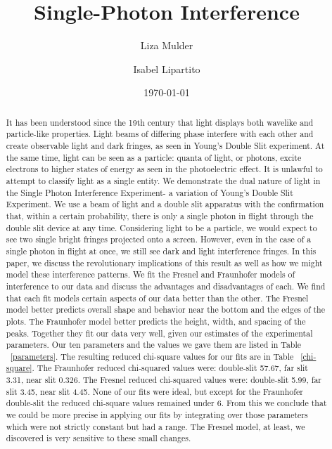 \documentclass[prb,preprint]{revtex4-1}
\begin{document}

\title{Single-Photon Interference}


\author{Liza Mulder}


\author{Isabel Lipartito}


\date{\today}



\begin{abstract}

It has been understood since the 19th century that light displays both wavelike and particle-like properties.  Light beams of differing phase interfere with each other and create observable light and dark fringes, as seen in Young's Double Slit experiment.  At the same time, light can be seen as a particle:  quanta of light, or photons, excite electrons to higher states of energy as seen in the photoelectric effect.  It is unlawful to attempt to classify light as a single entity.  We demonstrate the dual nature of light in the Single Photon Interference Experiment- a variation of Young's Double Slit Experiment.  We use a beam of light and a double slit apparatus with the confirmation that, within a certain probability, there is only a single photon in flight through the double slit device at any time.  Considering light to be a particle, we would expect to see two single bright fringes projected onto a screen.  However, even in the case of a single photon in flight at once, we still see dark and light interference fringes.  In this paper, we discuss the revolutionary implications of this result as well as how we might model these interference patterns.  We fit the Fresnel and Fraunhofer models of interference to our data and discuss the advantages and disadvantages of each.  We find that each fit models certain aspects of our data better than the other. The Fresnel model better predicts overall shape and behavior near the bottom and the edges of the plots.  The Fraunhofer model better predicts the height, width, and spacing of the peaks. Together they fit our data very well, given our estimates of the experimental parameters. Our ten parameters and the values we gave them are listed in Table ~\ref{parameters}. The resulting reduced chi-square values for our fits are in Table ~\ref{chi-square}.  The Fraunhofer reduced chi-squared values were: double-slit 57.67, far slit 3.31, near slit 0.326.  The Fresnel reduced chi-squared values were: double-slit 5.99, far slit 3.45, near slit 4.45. None of our fits were ideal, but except for the Fraunhofer double-slit the reduced chi-square values remained under 6. From this we conclude that we could be more precise in applying our fits by integrating over those parameters which were not strictly constant but had a range.  The Fresnel model, at least, we discovered is very sensitive to these small changes.  

\end{abstract}
\end{document}
